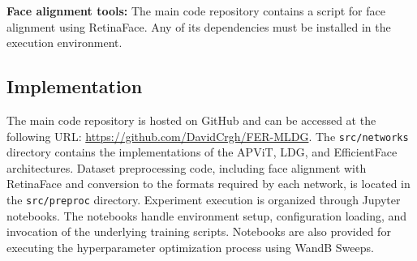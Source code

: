 \textbf{Face alignment tools:} The main code repository contains a script for face alignment using RetinaFace. Any of its dependencies must be installed in the execution environment.

\subsection{Implementation}\label{section:implementation}

The main code repository is hosted on GitHub and can be accessed at the following URL: \url{https://github.com/DavidCrgh/FER-MLDG}. The \texttt{src/networks} directory contains the implementations of the APViT, LDG, and EfficientFace architectures. Dataset preprocessing code, including face alignment with RetinaFace and conversion to the formats required by each network, is located in the \texttt{src/preproc} directory. Experiment execution is organized through Jupyter notebooks. The notebooks handle environment setup, configuration loading, and invocation of the underlying training scripts. Notebooks are also provided for executing the hyperparameter optimization process using WandB Sweeps.